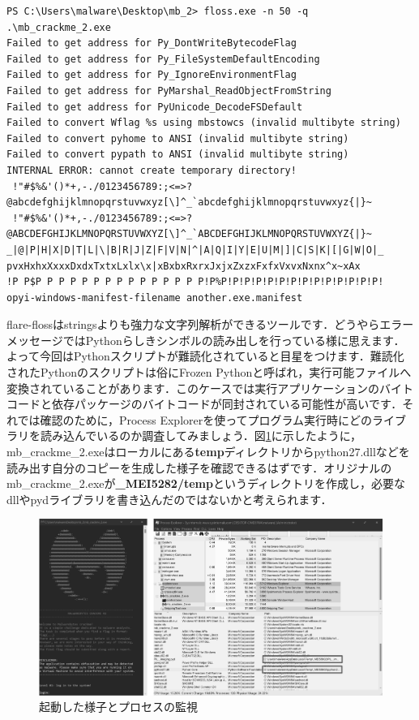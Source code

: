 \begin{tcolorbox}[title=文字列の抽出, sharp corners, left=2mm]\scriptsize
\begin{verbatim}
PS C:\Users\malware\Desktop\mb_2> floss.exe -n 50 -q .\mb_crackme_2.exe
Failed to get address for Py_DontWriteBytecodeFlag
Failed to get address for Py_FileSystemDefaultEncoding
Failed to get address for Py_IgnoreEnvironmentFlag
Failed to get address for PyMarshal_ReadObjectFromString
Failed to get address for PyUnicode_DecodeFSDefault
Failed to convert Wflag %s using mbstowcs (invalid multibyte string)
Failed to convert pyhome to ANSI (invalid multibyte string)
Failed to convert pypath to ANSI (invalid multibyte string)
INTERNAL ERROR: cannot create temporary directory!
 !"#$%&'()*+,-./0123456789:;<=>?@abcdefghijklmnopqrstuvwxyz[\]^_`abcdefghijklmnopqrstuvwxyz{|}~
 !"#$%&'()*+,-./0123456789:;<=>?@ABCDEFGHIJKLMNOPQRSTUVWXYZ[\]^_`ABCDEFGHIJKLMNOPQRSTUVWXYZ{|}~
_|@|P|H|X|D|T|L|\|B|R|J|Z|F|V|N|^|A|Q|I|Y|E|U|M|]|C|S|K|[|G|W|O|_
pvxHxhxXxxxDxdxTxtxLxlx\x|xBxbxRxrxJxjxZxzxFxfxVxvxNxnx^x~xAx
!P P$P P P P P P P P P P P P P P P!P%P!P!P!P!P!P!P!P!P!P!P!P!P!P!
opyi-windows-manifest-filename another.exe.manifest
\end{verbatim}
\end{tcolorbox}
flare-flossはstringsよりも強力な文字列解析ができるツールです．どうやらエラーメッセージではPythonらしきシンボルの読み出しを行っている様に思えます．よって今回はPythonスクリプトが難読化されていると目星をつけます．難読化されたPythonのスクリプトは俗にFrozen Pythonと呼ばれ，実行可能ファイルへ変換されていることがあります．このケースでは実行アプリケーションのバイトコードと依存パッケージのバイトコードが同封されている可能性が高いです．それでは確認のために，Process Explorerを使ってプログラム実行時にどのライブラリを読み込んでいるのか調査してみましょう．図\ref{fig:crackme_detail}に示したように，mb\_crackme\_2.exeはローカルにある\textbf{temp}ディレクトリからpython27.dllなどを読み出す自分のコピーを生成した様子を確認できるはずです．オリジナルのmb\_crackme\_2.exeが\textbf{\_MEI5282/temp}というディレクトリを作成し，必要なdllやpydライブラリを書き込んだのではないかと考えられます．
\begin{figure}[H]
    \centering
    \includegraphics[width=\linewidth]{./assets/takuzoo3868asset/proc_gray.png}
    \caption{起動した様子とプロセスの監視}
    \label{fig:crackme_detail}
\end{figure}
